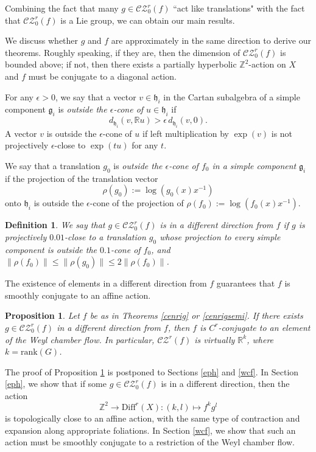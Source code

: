 \documentclass[11pt]{amsart}
\numberwithin{equation}{section}
\newcommand{\R}{\mathbb{R}}
\newcommand{\Z}{\mathbb{Z}}
\newcommand{\CZ}{\mathcal{CZ}}
\theoremstyle{plain}
\newtheorem{prop}[thm]{Proposition}
\newtheorem{defi}{Definition}[section]
\begin{document}
Combining the fact that many $g\in \CZ^r_0(f)$ ``act like translations" with the fact that $\CZ^r_0(f)$ is a Lie group, we can obtain our main results.

We discuss whether $g$ and $f$ are approximately in the same direction to derive our theorems. Roughly speaking, if they are, then the dimension of $\CZ^r_0(f)$ is bounded above; if not, then there exists a partially hyperbolic $\Z^2$-action on $X$ and $f$ must be conjugate to a diagonal action.

For any $\epsilon>0$, we say that a vector $v\in \mathfrak{h}_i$ in the Cartan subalgebra of a simple component $\mathfrak g_i$ is \emph{outside the $\epsilon$-cone of $u\in \mathfrak{h}_i$} if
\[
d_{\mathfrak{h}_i}(v, \R u) > \epsilon\, d_{\mathfrak{h}_i}(v,0).
\]
A vector $v$ is outside the $\epsilon$-cone of $u$ if left multiplication by $\exp(v)$ is not projectively $\epsilon$-close to $\exp(tu)$ for any $t$.

We say that a translation $g_0$ is \emph{outside the $\epsilon$-cone of $f_0$ in a simple component} $\mathfrak{g}_i$ if the projection of the translation vector
\[
\rho(g_0):=\log(g_0(x)x^{-1})
\]
onto $\mathfrak{h}_i$ is outside the $\epsilon$-cone of the projection of $\rho(f_0):=\log(f_0(x)x^{-1})$.


\begin{defi} 
We say that $g\in \CZ^r_0(f)$ \emph{is in a different direction from $f$} if $g$ is projectively $0.01$-close to a translation $g_0$ whose projection to every simple component is outside the $0.1$-cone of $f_0$, and $\|\rho(f_0)\|\le \|\rho(g_0)\|\le 2\|\rho(f_0)\|$. 
\end{defi}
\color{black}
The existence of elements in a different direction from $f$ guarantees that $f$ is smoothly conjugate to an affine action.

\begin{prop}\label{gph}
Let $f$ be as in Theorems \ref{cenrig} or \ref{cenrigsemi}. If there exists $g\in \CZ^r_0(f)$ in a different direction from $f$, then $f$ is $C^r$-conjugate to an element of the Weyl chamber flow. In particular, $\CZ^r(f)$ is virtually $\R^k$, where $k = \mathrm{rank}(G)$.
\end{prop}

The proof of Proposition \ref{gph} is postponed to Sections \ref{eph} and \ref{wcf}. In Section \ref{eph}, we show that if some $g\in \CZ^r_0(f)$ is in a different direction, then the action
\[
\Z^2 \to \mathrm{Diff}^r(X): (k,l) \mapsto f^k g^l
\]
is topologically close to an affine action, with the same type of contraction and expansion along appropriate foliations. In Section \ref{wcf}, we show that such an action must be smoothly conjugate to a restriction of the Weyl chamber flow.
\end{document}
